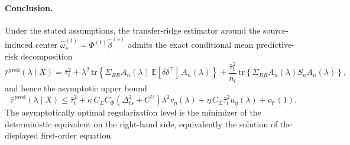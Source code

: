 \documentclass[11pt]{article}
\newcommand{\1}{\mathbf{1}}
\begin{document}
\bigskip

\paragraph{Conclusion.}
Under the stated assumptions, the transfer-ridge estimator around the source-induced center \(\hat\omega_s^{(t)}=\Phi^{(t)}\hat\beta^{(s)}\) admits the exact conditional mean predictive-risk decomposition
\[
\bar r^{\mathrm{pred}}(\lambda\mid X)
=
\bar\tau_t^2
+
\lambda^2\,\mathrm{tr}\!\left\{
\Sigma_{RR}A_n(\lambda)\,\mathbb E[\delta\delta^\top]\,A_n(\lambda)
\right\}
+
\frac{\bar\tau_t^2}{n_t}\,
\mathrm{tr}\!\left\{
\Sigma_{RR}A_n(\lambda)S_nA_n(\lambda)
\right\},
\]
and hence the asymptotic upper bound
\[
\bar r^{\mathrm{pred}}(\lambda\mid X)
\le
\bar\tau_t^2
+
\kappa\,C_\Sigma C_\Phi(\Delta_{ts}^2+C^U)\lambda^2 v_\eta(\lambda)
+
\eta\,C_\Sigma\bar\tau_t^2u_\eta(\lambda)
+
o_{\mathbb P}(1).
\]
The asymptotically optimal regularization level is the minimizer of the deterministic equivalent on the right-hand side, equivalently the solution of the displayed first-order equation.
\end{document}
